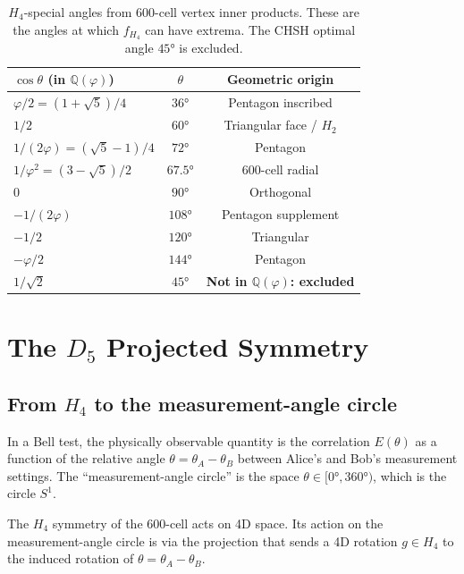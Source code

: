 \documentclass[11pt,a4paper]{article}
\newcommand{\phig}{\varphi}
\begin{document}
\begin{table}[H]
\centering
\caption{$H_4$-special angles from 600-cell vertex inner products.
  These are the angles at which $f_{H_4}$ can have extrema.
  The CHSH optimal angle $45°$ is excluded.}
\label{tab:special_angles}
\begin{tabular}{@{}lcc@{}}
\toprule
$\cos\theta$ (in $\mathbb{Q}(\phig)$) & $\theta$ & Geometric origin \\
\midrule
$\phig/2 = (1+\sqrt5)/4$ & $36°$ & Pentagon inscribed \\
$1/2$ & $60°$ & Triangular face / $H_2$ \\
$1/(2\phig) = (\sqrt5-1)/4$ & $72°$ & Pentagon \\
$1/\phig^2 = (3-\sqrt5)/2$ & $67.5°$ & 600-cell radial \\
$0$ & $90°$ & Orthogonal \\
$-1/(2\phig)$ & $108°$ & Pentagon supplement \\
$-1/2$ & $120°$ & Triangular \\
$-\phig/2$ & $144°$ & Pentagon \\
\midrule
$1/\sqrt{2}$ & $45°$ & \textbf{Not in $\mathbb{Q}(\phig)$: excluded} \\
\bottomrule
\end{tabular}
\end{table}

\section{The $D_5$ Projected Symmetry}

\subsection{From $H_4$ to the measurement-angle circle}

In a Bell test, the physically observable quantity is the correlation
$E(\theta)$ as a function of the relative angle $\theta = \theta_A
- \theta_B$ between Alice's and Bob's measurement settings.  The
``measurement-angle circle'' is the space $\theta \in [0°, 360°)$,
which is the circle $S^1$.

The $H_4$ symmetry of the 600-cell acts on 4D space.  Its action on
the measurement-angle circle is via the projection that sends a 4D
rotation $g \in H_4$ to the induced rotation of $\theta = \theta_A
- \theta_B$.
\end{document}

